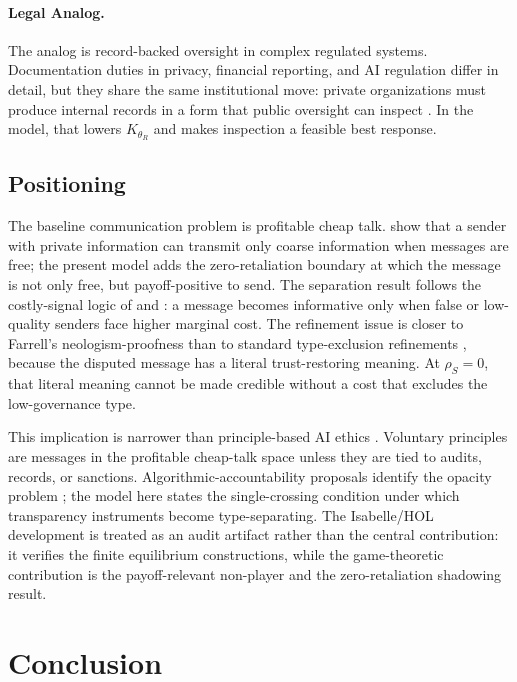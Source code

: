 \documentclass[review,authoryear]{elsarticle}
\theoremstyle{definition}
\theoremstyle{plain}
\begin{document}
\paragraph{Legal Analog.}
The analog is record-backed oversight in complex regulated systems.  Documentation duties in privacy, financial reporting, and AI regulation differ in detail, but they share the same institutional move: private organizations must produce internal records in a form that public oversight can inspect \citep{hadfield2017rules}.  In the model, that lowers $K_{\theta_R}$ and makes inspection a feasible best response.

\subsection{Positioning}
\label{subsec:positioning}

The baseline communication problem is profitable cheap talk.  \citet{crawford_sobel1982}
show that a sender with private information can transmit only coarse information
when messages are free; the present model adds the zero-retaliation boundary at which the message is not only free, but payoff-positive to send.  The separation result follows the costly-signal logic
of \citet{spence1973} and \citet{milgrom_roberts1986}: a message becomes
informative only when false or low-quality senders face higher marginal cost.
The refinement issue is closer to Farrell's neologism-proofness
\citep{farrell1993} than to standard type-exclusion refinements
\citep{cho_kreps1987,banks_sobel1987}, because the disputed message has a
literal trust-restoring meaning.  At $\rho_S=0$, that literal meaning cannot be
made credible without a cost that excludes the low-governance type.

This implication is narrower than principle-based AI ethics
\citep{floridi2018ai4people,jobin2019global}.  Voluntary principles are
messages in the profitable cheap-talk space unless they are tied to audits, records, or
sanctions.  Algorithmic-accountability proposals identify the opacity problem
\citep{pasquale2015}; the model here states the single-crossing condition under
which transparency instruments become type-separating.  The Isabelle/HOL
development is treated as an audit artifact rather than the central
contribution: it verifies the finite equilibrium constructions, while the
game-theoretic contribution is the payoff-relevant non-player and the
zero-retaliation shadowing result.

\section{Conclusion}
\label{sec:conclusion}
\end{document}

